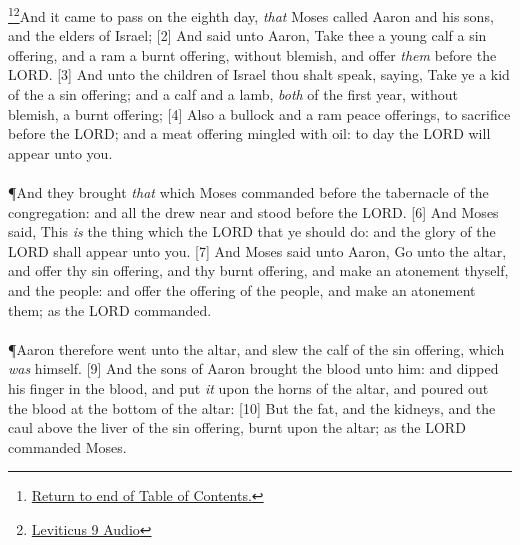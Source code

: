 \footnote{\textcolor[cmyk]{0.99998,1,0,0}{\hyperlink{TOC}{Return to end of Table of Contents.}}}\footnote{\href{https://audiobible.com/bible/leviticus_9.html}{\textcolor[cmyk]{0.99998,1,0,0}{Leviticus 9 Audio}}}\textcolor[cmyk]{0.99998,1,0,0}{And it came to pass on the eighth day, \emph{that} Moses called Aaron and his sons, and the elders of Israel;}
[2] \textcolor[cmyk]{0.99998,1,0,0}{And  said unto Aaron, Take thee a young calf   a sin offering, and a ram   a burnt offering, without blemish, and offer \emph{them} before the LORD.}
[3] \textcolor[cmyk]{0.99998,1,0,0}{And unto the children of Israel thou shalt speak, saying, Take ye a kid of the    a sin offering; and a calf and a lamb, \emph{both} of the first year, without blemish,   a burnt offering;}
[4] \textcolor[cmyk]{0.99998,1,0,0}{Also a bullock and a ram   peace offerings, to sacrifice before the LORD; and a meat offering mingled with oil:   to day the LORD will appear unto you.}\\
\\
\P \textcolor[cmyk]{0.99998,1,0,0}{And they brought \emph{that} which Moses commanded before the tabernacle of the congregation: and all the  drew near and stood before the LORD.}
[6] \textcolor[cmyk]{0.99998,1,0,0}{And Moses said, This \emph{is} the thing which the LORD  that ye should do: and the glory of the LORD shall appear unto you.}
[7] \textcolor[cmyk]{0.99998,1,0,0}{And Moses said unto Aaron, Go unto the altar, and offer thy sin offering, and thy burnt offering, and make an atonement   thyself, and   the people: and offer the offering of the people, and make an atonement   them; as the LORD commanded.}\\
\\
\P \textcolor[cmyk]{0.99998,1,0,0}{Aaron therefore went unto the altar, and slew the calf of the sin offering, which \emph{was}   himself.}
[9] \textcolor[cmyk]{0.99998,1,0,0}{And the sons of Aaron brought the blood unto him: and  dipped his finger in the blood, and put \emph{it} upon the horns of the altar, and poured out the blood at the bottom of the altar:}
[10] \textcolor[cmyk]{0.99998,1,0,0}{But the fat, and the kidneys, and the caul above the liver of the sin offering,  burnt upon the altar; as the LORD commanded Moses.}

